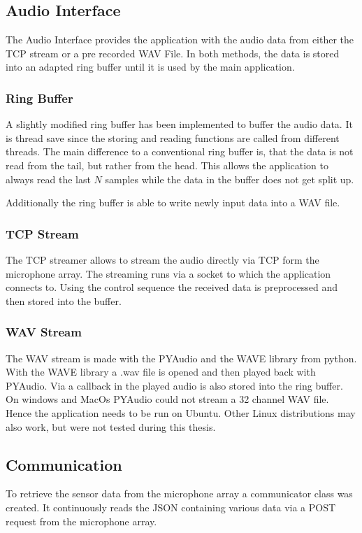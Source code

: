 \subsection{Audio Interface}
The Audio Interface provides the application with the audio data
from either the TCP stream or a pre recorded WAV File.
In both methods, the data is stored into an adapted ring buffer
until it is used by the main application.
\subsubsection{Ring Buffer}
A slightly modified ring buffer has been implemented to buffer the
audio data.
It is thread save since the storing and reading functions are called from
different threads.
The main difference to a conventional ring buffer is, that the data is not
read from the tail, but rather from the head.
This allows the application to always read the last $N$ samples while the data
in the buffer does not get split up.

Additionally the ring buffer is able to write newly input data into a
WAV file.

\subsubsection{TCP Stream}
The TCP streamer allows to stream the audio directly via TCP form the microphone array.
The streaming runs via a socket to which the application connects to.
Using the control sequence the received data is preprocessed and then stored into
the buffer.

\subsubsection{WAV Stream}
The WAV stream is made with the PYAudio and the WAVE library from python.
With the WAVE library a .wav file is opened and then
played back with PYAudio.
Via a callback in the played audio is also stored into the ring buffer.
On windows and MacOs PYAudio could not stream a 32 channel WAV file.
Hence the application needs to be run on Ubuntu.
Other Linux distributions may also work, but were not tested during
this thesis.

\subsection{Communication}
To retrieve the sensor data from the microphone array
a communicator class was created.
It continuously reads the JSON containing various data
via a POST request from the microphone array.

